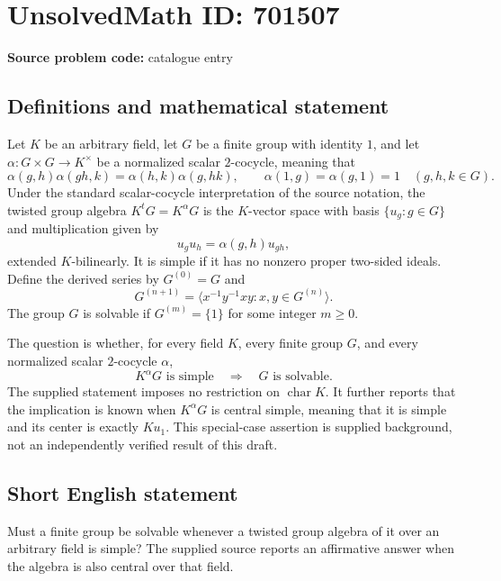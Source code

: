 \documentclass[11pt]{article}
\begin{document}
\section*{UnsolvedMath ID: 701507}
\textbf{Source problem code:} catalogue entry
\subsection{Definitions and mathematical statement}
Let \(K\) be an arbitrary field, let \(G\) be a finite group with identity \(1\), and let \(\alpha\colon G\times G\to K^{\times}\) be a normalized scalar \(2\)-cocycle, meaning that
\[
\alpha(g,h)\alpha(gh,k)=\alpha(h,k)\alpha(g,hk),\qquad
\alpha(1,g)=\alpha(g,1)=1
\quad(g,h,k\in G).
\]
Under the standard scalar-cocycle interpretation of the source notation, the twisted group algebra \(K^tG=K^{\alpha}G\) is the \(K\)-vector space with basis \(\{u_g:g\in G\}\) and multiplication given by
\[
u_gu_h=\alpha(g,h)u_{gh},
\]
extended \(K\)-bilinearly. It is simple if it has no nonzero proper two-sided ideals. Define the derived series by \(G^{(0)}=G\) and
\[
G^{(n+1)}=\langle x^{-1}y^{-1}xy:x,y\in G^{(n)}\rangle.
\]
The group \(G\) is solvable if \(G^{(m)}=\{1\}\) for some integer \(m\geq 0\).

The question is whether, for every field \(K\), every finite group \(G\), and every normalized scalar \(2\)-cocycle \(\alpha\),
\[
K^{\alpha}G\text{ is simple}\quad\Longrightarrow\quad G\text{ is solvable}.
\]
The supplied statement imposes no restriction on \(\operatorname{char}K\). It further reports that the implication is known when \(K^{\alpha}G\) is central simple, meaning that it is simple and its center is exactly \(K u_1\). This special-case assertion is supplied background, not an independently verified result of this draft.
\subsection{Short English statement}
Must a finite group be solvable whenever a twisted group algebra of it over an arbitrary field is simple? The supplied source reports an affirmative answer when the algebra is also central over that field.
\end{document}
